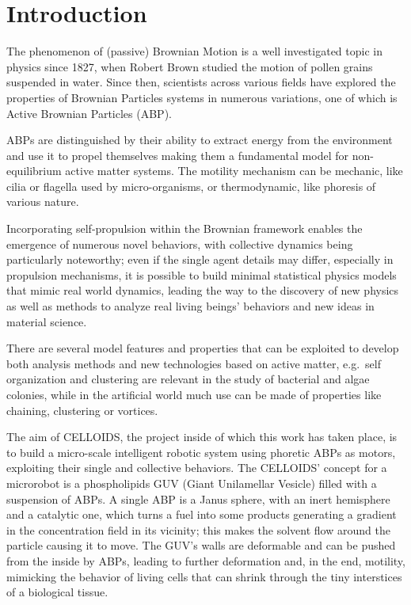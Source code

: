 \documentclass[../../master_thesis_np.tex]{subfiles}
\begin{document}
 
\chapter{Introduction}
	The phenomenon of (passive) Brownian Motion is a well investigated topic in physics since 1827, when Robert Brown studied the motion of pollen grains suspended in water.
	Since then, scientists across various fields have explored the properties of Brownian Particles systems in numerous variations, one of which is Active Brownian Particles (ABP). 
	
	ABPs are distinguished by their ability to extract energy from the environment and use it to propel themselves making them a fundamental model for non-equilibrium active matter systems.	
	The motility mechanism can be mechanic, like cilia or flagella used by micro-organisms, or thermodynamic, like phoresis of various nature. 
	
	Incorporating self-propulsion within the Brownian framework enables the emergence of numerous novel behaviors, with collective dynamics being particularly noteworthy; even if the single agent details may differ, especially in propulsion mechanisms, it is possible to build minimal statistical physics models that mimic real world dynamics, leading the way to the discovery of new physics as well as methods to analyze real living beings' behaviors and new ideas in material science. 
	
	There are several model features and properties that can be exploited to develop both analysis methods and new technologies based on active matter, e.g.\ self organization and clustering are relevant in the study of bacterial and algae colonies, while in the artificial world much use can be made of properties like chaining, clustering or vortices.
	
	The aim of CELLOIDS, the project inside of which this work has taken place, is to build a micro-scale intelligent robotic system using phoretic ABPs as motors, exploiting their single and collective behaviors. The CELLOIDS’ concept for a microrobot is a phospholipids GUV (Giant Unilamellar Vesicle) filled with a suspension of ABPs. A single ABP is a Janus sphere, with an inert hemisphere and a catalytic one, which turns a fuel into some products generating a gradient in the concentration field in its vicinity; this makes the solvent flow around the particle causing it to move. The GUV’s walls are deformable and can be pushed from the inside by ABPs, leading to further deformation and, in the end, motility, mimicking the behavior of living cells that can shrink through the tiny interstices of a biological tissue. 
	
\end{document}
